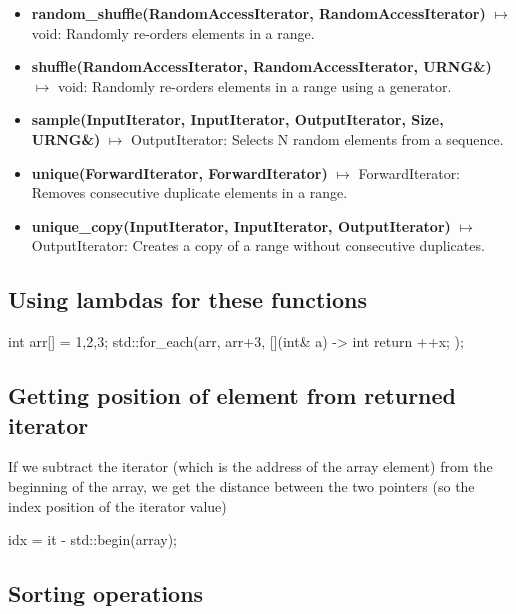 \documentclass{report}
\begin{document}
\begin{itemize}
    \item \textbf{random\_shuffle(RandomAccessIterator, RandomAccessIterator)} \(\mapsto\) void: Randomly re-orders elements in a range.
    \item \textbf{shuffle(RandomAccessIterator, RandomAccessIterator, URNG\&)} \(\mapsto\) void: Randomly re-orders elements in a range using a generator.
    \item \textbf{sample(InputIterator, InputIterator, OutputIterator, Size, URNG\&)} \(\mapsto\) OutputIterator: Selects N random elements from a sequence.
    \item \textbf{unique(ForwardIterator, ForwardIterator)} \(\mapsto\) ForwardIterator: Removes consecutive duplicate elements in a range.
    \item \textbf{unique\_copy(InputIterator, InputIterator, OutputIterator)} \(\mapsto\) OutputIterator: Creates a copy of a range without consecutive duplicates.
    \end{itemize}
    
    \bigbreak \noindent 
    \subsection{Using lambdas for these functions}
    \bigbreak \noindent 
    \begin{cppcode}
        int arr[]  = {1,2,3};
        std::for_each(arr, arr+3, [](int& a) -> int { return ++x; });
    \end{cppcode}

    \bigbreak \noindent 
    \subsection{Getting position of element from returned iterator}
    \bigbreak \noindent 
    \begin{concept}
        If we subtract the iterator (which is the address of the array element) from the beginning of the array, we get the distance between the two pointers (so the index position of the iterator value) 
        \bigbreak \noindent 
        \begin{cppcode}
        idx = it - std::begin(array);
        \end{cppcode}
    \end{concept}

    \pagebreak \bigbreak \noindent 
    \subsection{Sorting operations}
    \begin{itemize}
        
    \end{itemize}
\end{document}
